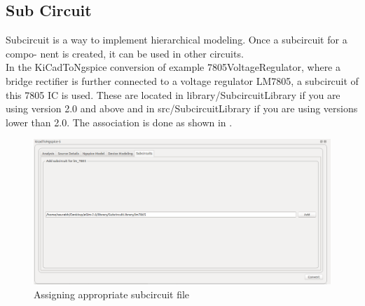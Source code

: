\subsection{Sub Circuit}
Subcircuit is a way to implement hierarchical modeling.  Once a subcircuit for a compo-
nent is created, it can be used in other circuits. \\
In the KiCadToNgspice conversion of example 7805VoltageRegulator, where a bridge rectifier is further connected to a voltage regulator LM7805, a subcircuit of this 7805 IC is used. These are located in library/SubcircuitLibrary if you are using version 2.0 and above and in src/SubcircuitLibrary if you are using versions lower than 2.0. The association is done as shown in .
\begin{figure}
\centering
\includegraphics[width=\lgfig]{7805.png}
\caption{Assigning appropriate subcircuit file }
\label{7805}
\end{figure}
\\
